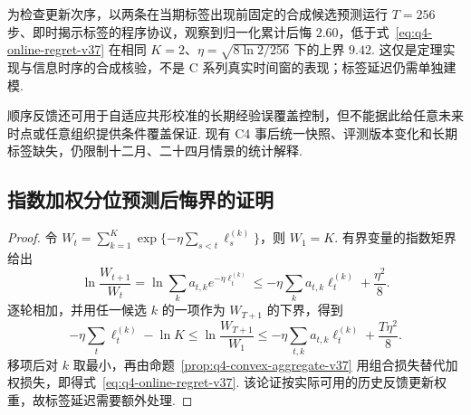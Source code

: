 为检查更新次序，以两条在当期标签出现前固定的合成候选预测运行 $T=256$ 步、即时揭示标签的程序协议，观察到归一化累计后悔 $2.60$，低于式~\eqref{eq:q4-online-regret-v37} 在相同 $K=2$、$\eta=\sqrt{8\ln2/256}$ 下的上界 $9.42$. 这仅是定理实现与信息时序的合成核验，不是 C 系列真实时间窗的表现；标签延迟仍需单独建模. 

顺序反馈还可用于自适应共形校准的长期经验误覆盖控制\cite{gibbs_aci}，但不能据此给任意未来时点或任意组织提供条件覆盖保证. 现有 C4 事后统一快照、评测版本变化和长期标签缺失，仍限制十二月、二十四月情景的统计解释. 

\subsection{指数加权分位预测后悔界的证明}\label{app:q4-online-regret-v37}
\begin{proof}
令 $W_t=\sum_{k=1}^K\exp\{-\eta\sum_{s<t}\ell_s^{(k)}\}$，则 $W_1=K$. 有界变量的指数矩界给出
\[
\ln\frac{W_{t+1}}{W_t}
=\ln\sum_ka_{t,k}e^{-\eta\ell_t^{(k)}}
\le-\eta\sum_ka_{t,k}\ell_t^{(k)}+\frac{\eta^2}{8}.
\]
逐轮相加，并用任一候选 $k$ 的一项作为 $W_{T+1}$ 的下界，得到
\[
-\eta\sum_t\ell_t^{(k)}-\ln K
\le\ln\frac{W_{T+1}}{W_1}
\le-\eta\sum_{t,k}a_{t,k}\ell_t^{(k)}+\frac{T\eta^2}{8}.
\]
移项后对 $k$ 取最小，再由命题~\ref{prop:q4-convex-aggregate-v37} 用组合损失替代加权损失，即得式~\eqref{eq:q4-online-regret-v37}. 该论证按实际可用的历史反馈更新权重，故标签延迟需要额外处理. 
\end{proof}
\resetappendixfloats
